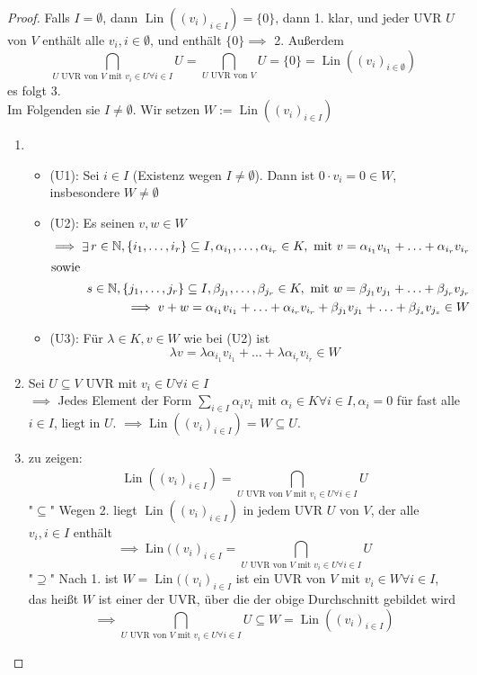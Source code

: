 \documentclass[a4paper]{scrartcl}
\DeclareMathOperator{\Exists}{\exists}
\DeclareMathOperator{\Forall}{\forall}
\DeclareMathOperator{\Lin}{Lin}
\theoremstyle{definition}
\theoremstyle{plain}
\theoremstyle{plain}
\theoremstyle{remark}
\theoremstyle{remark}
\theoremstyle{remark}
\theoremstyle{remark}
\theoremstyle{remark}
\begin{document}
\begin{proof}
Falls $I = \emptyset$, dann $\Lin((v_i)_{i\in I}) = \{0\}$, dann 1. klar, und jeder UVR $U$ von $V$ enthält alle $v_i, i\in \emptyset$, und enthält $\{0\} \implies$ 2. Außerdem
\[\bigcap_{\text{$U$ UVR von $V$ mit $v_i \in U \Forall i\in I$}} U = \bigcap_{\text{$U$ UVR von $V$}} U = \{0\} = \Lin((v_i)_{i\in\emptyset})\]
es folgt 3. \\

Im Folgenden sie $I \neq \emptyset$. Wir setzen $W:= \Lin((v_i)_{i\in I})$
\begin{enumerate}
\item \begin{itemize}
\item (U1): Sei $i \in I$ (Existenz wegen $I \neq \emptyset$). Dann ist $0\cdot v_i = 0\in W$, insbesondere $W\neq\emptyset$
\item (U2): Es seinen $v,w \in W$
\begin{align*}
\implies \Exists r\in\mathbb{N}, \{i_1, \ldots, i_r\} \subseteq I, \alpha_{i_1}, \ldots, \alpha_{i_r} \in K,~\text{mit}~v = \alpha_{i_1} v_{i_1} + \ldots + \alpha_{i_r} v_{i_r} \\
\intertext{sowie}
s\in\mathbb{N}, \{j_1, \ldots, j_r\} \subseteq I, \beta_{j_1}, \ldots, \beta_{j_r} \in K,~\text{mit}~w = \beta_{j_1} v_{j_1} + \ldots + \beta_{j_r} v_{j_r} \\
\implies v + w = \alpha_{i_1} v_{i_1} + \ldots + \alpha_{i_r} v_{i_r} + \beta_{j_1} v_{j_1} + \ldots + \beta_{j_s} v_{j_s} \in W
\end{align*}
\item (U3): Für $\lambda \in K, v\in W$ wie bei (U2) ist
\[\lambda v = \lambda \alpha_{i_1} v_{i_1} + \ldots + \lambda \alpha_{i_r} v_{i_r} \in W\]
\end{itemize}
\item Sei $U\subseteq V$ UVR mit $v_i \in U \Forall i\in I$ \\
     $\implies$ Jedes Element der Form $\displaystyle \sum_{i \in I} \alpha_i v_i$ mit $\alpha_i \in K \Forall i\in I, \alpha_i = 0$ für fast alle $i\in I$, liegt
in $U$. $\implies \Lin((v_i)_{i\in I}) = W \subseteq U$.
\item zu zeigen: \[\Lin((v_i)_{i \in I}) = \bigcap_{\text{$U$ UVR von $V$ mit $v_i \in U \Forall i\in I$}} U\]
"$\subseteq$" Wegen 2. liegt $\Lin((v_i)_{i\in I})$ in jedem UVR $U$ von $V$, der alle $v_i, i\in I$ enthält
\[\implies \Lin((v_i)_{i\in I} = \bigcap_{\text{$U$ UVR von $V$ mit $v_i \in U \Forall i\in I$}} U\]
"$\supseteq$" Nach 1. ist $W = \Lin((v_i)_{i\in I}$ ist ein UVR von $V$ mit $v_i \in W \Forall i\in I$, das heißt $W$ ist einer der UVR, über die der obige Durchschnitt gebildet wird
\[\implies \bigcap_{\text{$U$ UVR von $V$ mit $v_i \in U \Forall i\in I$}} U \subseteq W = \Lin((v_i)_{i\in I})\]
\end{enumerate}
\end{proof}
\end{document}
